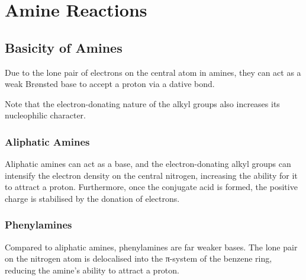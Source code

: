 





	\pagebreak
	\section{Amine Reactions}

		\subsection{Basicity of Amines}

			Due to the lone pair of electrons on the central  atom in amines, they can act as a weak Brønsted base to accept a proton
			via a dative bond.

			Note that the electron-donating nature of the alkyl groups also increases its nucleophilic character.

			\subsubsection{Aliphatic Amines}

				Aliphatic amines can act as a base, and the electron-donating alkyl groups can intensify the electron density on the
				central nitrogen, increasing the ability for it to attract a proton. Furthermore, once the conjugate acid is formed, the
				positive charge is stabilised by the donation of electrons.



			\subsubsection{Phenylamines}

				Compared to aliphatic amines, phenylamines are far weaker bases. The lone pair on the nitrogen atom is delocalised into
				the π-system of the benzene ring, reducing the amine's ability to attract a proton.




